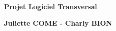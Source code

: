 \thispagestyle{empty}

\begin{titlepage}

\vspace*{2cm}

\begin{center}\textbf{\Huge Projet Logiciel Transversal}\end{center}{\Large \par}

\begin{center}\textbf{\large Juliette COME - Charly BION}\end{center}{\large \par}

\vspace{2cm}
\clearpage

{\small
\tableofcontents
}

\end{titlepage}

\clearpage
